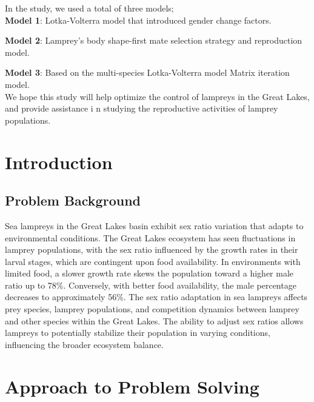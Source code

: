 \documentclass[12pt]{article}
\begin{document}
In the study, we used a total of three models;\\

\textbf{Model 1}: Lotka-Volterra model that introduced gender change factors.

\textbf{Model 2}: Lamprey's body shape-first mate selection strategy and reproduction model.

\textbf{Model 3}: Based on the multi-species Lotka-Volterra model Matrix iteration model. \\

We hope this study will help optimize the control of lampreys in the Great Lakes, and provide assistance i
n studying the reproductive activities of lamprey populations.
\newpage
\tableofcontents
\newpage
\clearpage
\pagestyle{fancy}
\newpage
\setcounter{page}{1}


\section{Introduction}
\subsection{Problem Background}

Sea lampreys in the Great Lakes basin exhibit sex ratio variation that adapts to environmental conditions.
The Great Lakes ecosystem has seen fluctuations in lamprey populations, with the sex ratio influenced by
the growth rates in their larval stages, which are contingent upon food availability. In environments with
limited food, a slower growth rate skews the population toward a higher male ratio up to 78\%. Conversely,
with better food availability, the male percentage decreases to approximately 56\%. The sex ratio adaptation
in sea lampreys affects prey species, lamprey populations, and competition dynamics between lamprey and other
species within the Great Lakes. The ability to adjust sex ratios allows lampreys to potentially stabilize
their population in varying conditions, influencing the broader ecosystem balance.

\section{Approach to Problem Solving}
\end{document}
